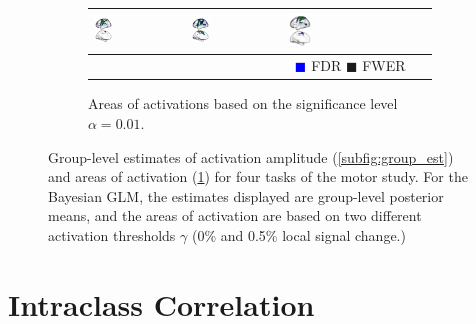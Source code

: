 \documentclass{article}
\begin{document}
\begin{figure}
\begin{subfigure}{\textwidth}
\begin{tabularx}{\textwidth}{|m{1em}|X|X|X|X|}
				\includegraphics[width=0.2\textwidth]{plots/604_tongue_classical_activation_map.png} &
				\includegraphics[width=0.2\textwidth]{plots/604_foot_classical_activation_map.png} &
				\includegraphics[width=0.2\textwidth]{plots/604_hand_classical_activation_map.png} \\ \hline
				\multicolumn{2}{c}{} & \multicolumn{2}{c}{\textcolor{Blue}{$\blacksquare$} FDR \textcolor{OliveGreen}{$\blacksquare$} FWER } & \multicolumn{1}{c}{} \\
			\end{tabularx}	
		\caption{Areas of activations based on the significance level $\alpha = 0.01$.}
		\label{subfig:group_act}
		\end{subfigure}
	\caption{Group-level estimates of activation amplitude (\ref{subfig:group_est}) and areas of activation (\ref{subfig:group_act}) for four tasks of the motor study. For the Bayesian GLM, the estimates displayed are group-level posterior means, and the areas of activation are based on two different activation thresholds $\gamma$ (0\% and 0.5\% local signal change.)}
	\label{fig:group_est_and_act}
	\end{figure}
	
	\newpage

	\section{Intraclass Correlation}
	
\end{document}
